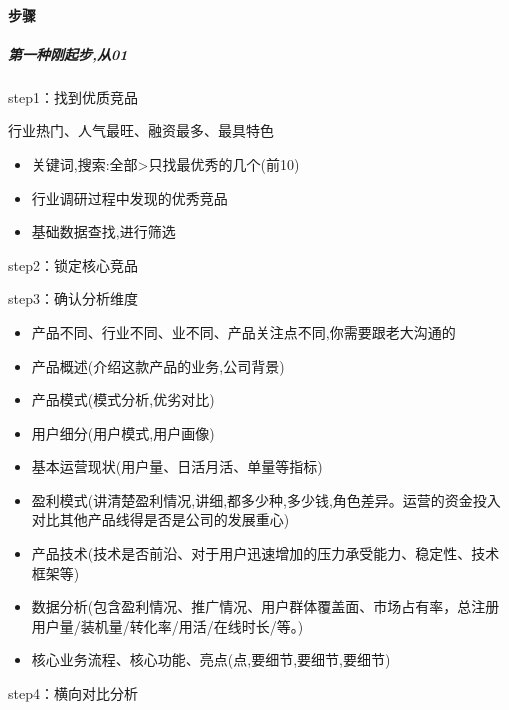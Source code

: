 \documentclass[letterpaper,10pt,english]{sphinxmanual}
\begin{document}
\paragraph{步骤}
\label{\detokenize{chapter_knowledge/goods_analysis:id21}}

\subparagraph{第一种刚起步,从0\sphinxhyphen{}1}
\label{\detokenize{chapter_knowledge/goods_analysis:id22}}
step1：找到优质竞品

行业热门、人气最旺、融资最多、最具特色
\begin{itemize}
\item {} 
关键词,搜索:全部>只找最优秀的几个(前10)

\item {} 
行业调研过程中发现的优秀竞品

\item {} 
基础数据查找,进行筛选

\end{itemize}

step2：锁定核心竞品

step3：确认分析维度
\begin{itemize}
\item {} 
产品不同、行业不同、业不同、产品关注点不同,你需要跟老大沟通的

\item {} 
产品概述(介绍这款产品的业务,公司背景)

\item {} 
产品模式(模式分析,优劣对比)

\item {} 
用户细分(用户模式,用户画像)

\item {} 
基本运营现状(用户量、日活月活、单量等指标)

\item {} 
盈利模式(讲清楚盈利情况,讲细,都多少种,多少钱,角色差异。运营的资金投入对比其他产品线得是否是公司的发展重心)

\item {} 
产品技术(技术是否前沿、对于用户迅速增加的压力承受能力、稳定性、技术框架等)

\item {} 
数据分析(包含盈利情况、推广情况、用户群体覆盖面、市场占有率，总注册用户量/装机量/转化率/用活/在线时长/等。)

\item {} 
核心业务流程、核心功能、亮点(点,要细节,要细节,要细节)

\end{itemize}

step4：横向对比分析
\end{document}
